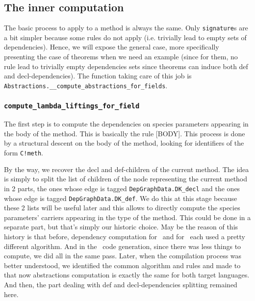 \subsection{The inner computation}
The basic process to apply to a method is always the same. Only
{\tt signature}s are a bit simpler because some rules do not apply
(i.e. trivially lead to empty sets of dependencies). Hence, we will
expose the general case, more specifically presenting the case of
theorems when we need an example (since for them, no rule lead to
trivially empty dependencies sets since theorems can induce both def
and decl-dependencies). The function taking care of this job is
{\tt Abstractions.\_\_compute\_abstractions\_for\_fields}.


\subsubsection{{\tt compute\_lambda\_liftings\_for\_field}}
The first step is to compute the dependencies on species parameters
appearing in the body of the method. This is basically the rule
[BODY]. This process is done by a structural descent on the body of
the method, looking for identifiers of the form {\tt C!meth}.

\medskip
By the way, we recover the decl and def-children of the current
method. The idea is simply to split the list of children of the node
representing the current method in 2 parts, the ones whose edge is
tagged {\tt DepGraphData.DK\_decl} and the ones whose edge is tagged
{\tt DepGraphData.DK\_def}. We do this at this stage because these 2
lists will be useful later and this allows to directly compute the
species parameters' carriers appearing in the type of the method. This
could be done in a separate part, but that's simply our historic
choice. May be the reason of this history is that before, dependency
computation for \ocaml\ and for \coq\ each used a pretty different
algorithm. And in the \ocaml\ code generation, since there was less
things to compute, we did all in the same pass. Later, when the
compilation process was better understood, we identified the common
algorithm and rules and made to that now abstractions computation is
exactly the same for both target languages. And then, the part dealing
with def and decl-dependencies splitting remained here.

